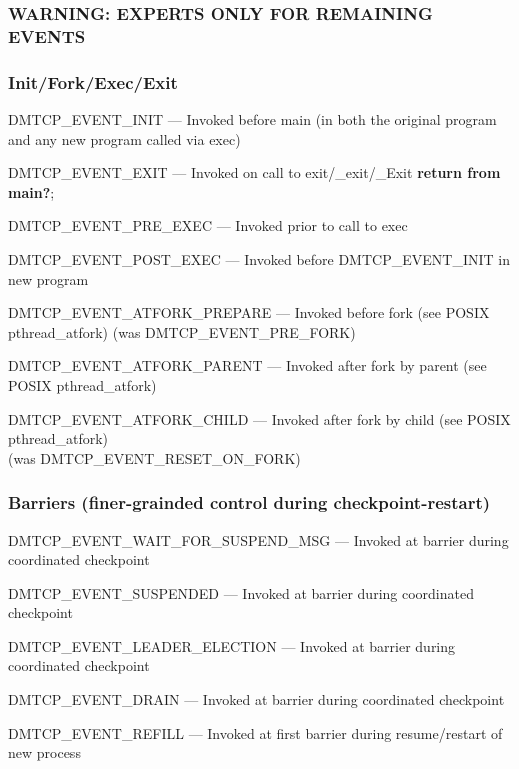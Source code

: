 \documentclass{article}
\begin{document}
\subsubsection*{WARNING:  EXPERTS ONLY FOR REMAINING EVENTS}
\subsubsection*{Init/Fork/Exec/Exit}
\begin{list}{}{\leftmargin=3em \itemindent=-2em}
\item
  DMTCP\_EVENT\_INIT --- Invoked before main (in both the original program
and any new program called via exec)
\item
  DMTCP\_EVENT\_EXIT --- Invoked on call to exit/\_exit/\_Exit {\bf return from main?};
\item
  DMTCP\_EVENT\_PRE\_EXEC --- Invoked prior to call to exec
\item
  DMTCP\_EVENT\_POST\_EXEC --- Invoked before DMTCP\_EVENT\_INIT in new program
\item
  DMTCP\_EVENT\_ATFORK\_PREPARE --- Invoked before fork (see POSIX pthread\_atfork)
(was DMTCP\_EVENT\_PRE\_FORK)
\item
  DMTCP\_EVENT\_ATFORK\_PARENT --- Invoked after fork by parent (see POSIX
    pthread\_atfork)
\item
  DMTCP\_EVENT\_ATFORK\_CHILD --- Invoked after fork by child (see POSIX
    pthread\_atfork) \\
   (was DMTCP\_EVENT\_RESET\_ON\_FORK)
\end{list}

\subsubsection*{Barriers (finer-grainded control during checkpoint-restart)}
\begin{list}{}{\leftmargin=3em \itemindent=-2em}
\item
  DMTCP\_EVENT\_WAIT\_FOR\_SUSPEND\_MSG --- Invoked at barrier during
coordinated checkpoint
\item
  DMTCP\_EVENT\_SUSPENDED --- Invoked at barrier during coordinated checkpoint
\item
  DMTCP\_EVENT\_LEADER\_ELECTION --- Invoked at barrier during coordinated checkpoint
\item
  DMTCP\_EVENT\_DRAIN --- Invoked at barrier during coordinated checkpoint
\item
  DMTCP\_EVENT\_REFILL --- Invoked at first barrier during resume/restart of new process
\end{list}
\end{document}
